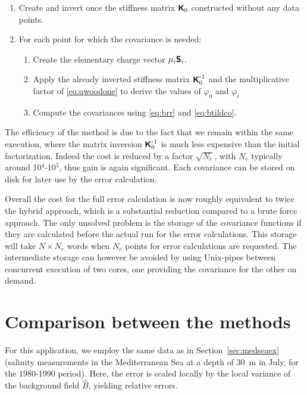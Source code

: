 \begin{enumerate}
\item Create and invert once the stiffness matrix $\mbox{\boldmath $ \protect\mathsf{K} $}_0$ constructed without any data points. 
\item For each point for which the covariance is needed:
\begin{enumerate}
\item Create the elementary charge vector $\mu_i \mbox{\boldmath $ \protect\mathsf{S} $}_i$.
\item Apply the already inverted stiffness matrix ${\mbox{\boldmath $ \protect\mathsf{K} $}}^{ \mbox{\small{-}} 1}_0$  and the multiplicative factor of \eqref{eq:qwoodone} to derive the values of $\varphi_0$ and $\varphi_i$
\item Compute the covariances using \eqref{eq:brr} and \eqref{eq:btildco}.
\end{enumerate}
\end{enumerate}

The efficiency of the method is due to the fact that we remain within the same \diva execution, where the matrix inversion ${\mbox{\boldmath $ \protect\mathsf{K} $}}^{ \mbox{\small{-}} 1}_0$  is much less expensive than the initial factorization. Indeed the cost is reduced by a factor $\sqrt{N_e}$, with $N_e$ typically around 10$^4$-10$^5$, thus gain is again significant. Each covariance can be stored on disk for later use by the error calculation.

Overall the cost for the full error calculation is now roughly equivalent to twice the hybrid approach, which is a substantial reduction compared to a brute force approach. The only unsolved problem is the storage of the covariance functions if they are calculated before the actual \diva run for the error calculations. This storage will take $N \times N_c$ words when $N_c$ points for error calculations are requested. The intermediate storage can however be avoided by using Unix-pipes between concurrent execution of two \diva cores, one providing the covariance for the other on demand.

\section{Comparison between the methods}


For this application, we employ the same data as in Section~\ref{sec:medseaex} (salinity measurements in the Mediterranean Sea at a depth of 30~m in July, for the 1980-1990 period). Here, the error is scaled locally by the local variance of the background field $\hat{B}$, yielding relative errors. 

